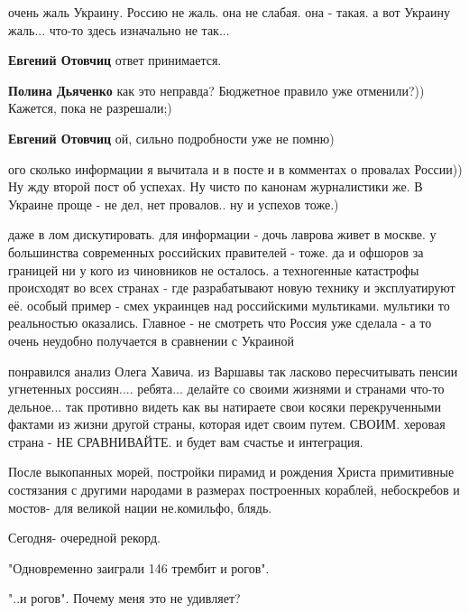 \begin{itemize}
\begin{itemize}
очень жаль Украину. Россию не жаль. она не слабая. она - такая. а вот Украину жаль... что-то здесь изначально не так...

\textbf{Евгений Отовчиц} ответ принимается.

\textbf{Полина Дьяченко} как это неправда? Бюджетное правило уже отменили?)) Кажется, пока не разрешали;)

\textbf{Евгений Отовчиц} ой, сильно подробности уже не помню)


\end{itemize} %


ого сколько информации я вычитала и в посте и в комментах о провалах России))
Ну жду второй пост об успехах. Ну чисто по канонам журналистики же. В Украине
проще - не дел, нет провалов.. ну и успехов тоже.)


даже в лом дискутировать. для информации - дочь лаврова живет в москве. у
большинства современных российских правителей - тоже. да и офшоров за границей
ни у кого из чиновников не осталось. а техногенные катастрофы происходят во
всех странах - где разрабатывают новую технику и эксплуатируют её. особый
пример - смех украинцев над российскими мультиками. мультики то реальностью
оказались. Главное - не смотреть что Россия уже сделала - а то очень неудобно
получается в сравнении с Украиной



понравился анализ Олега Хавича. из Варшавы так ласково пересчитывать пенсии угнетенных россиян....
ребята... делайте со своими жизнями и странами что-то дельное... так противно
видеть как вы натираете свои косяки перекрученными фактами из жизни другой
страны, которая идет своим путем. СВОИМ. херовая страна - НЕ СРАВНИВАЙТЕ. и
будет вам счастье и интеграция.

\begin{itemize} %

После выкопанных морей, постройки пирамид и рождения Христа примитивные
состязания с другими народами в размерах построенных кораблей, небоскребов и
мостов- для великой нации не.комильфо, блядь.

Сегодня- очередной рекорд.

"Одновременно заиграли 146 трембит и рогов".

"..и рогов". Почему меня это не удивляет?


\end{itemize}
\end{itemize}
